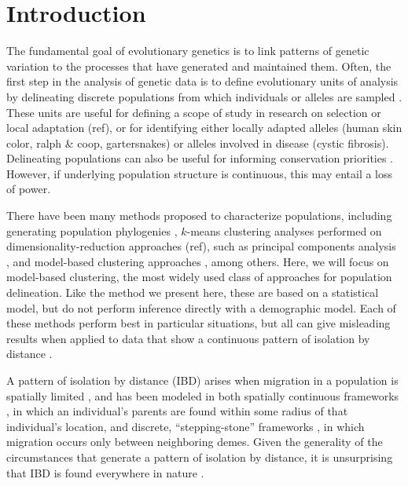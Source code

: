 \documentclass[12pt]{article}
\begin{document}
\newpage
\section*{Introduction}
The fundamental goal of evolutionary genetics is to link patterns of genetic variation 
to the processes that have generated and maintained them.
Often, the first step in the analysis of genetic data is to define evolutionary units of analysis
by delineating discrete populations from which individuals or alleles are sampled \citep{wright1949genetical}.
These units are useful for defining a scope of study in research on selection or local adaptation (ref),
or for identifying either locally adapted alleles (human skin color, ralph \& coop, gartersnakes) or alleles involved in disease (cystic fibrosis).
Delineating populations can also be useful for informing conservation priorities \citep{Moritz1994,Waples_1998,Moritz_etal_2002}.
However, if underlying population structure is continuous, this may entail a loss of power.

There have been many methods proposed to characterize populations,
including generating population phylogenies \citep{CavalliSforza1975, treemix},
$k$-means clustering analyses performed on dimensionality-reduction approaches (ref), 
such as principal components analysis \citep{menozzi1978synthetic,novembre_interpreting_2008, price2006eigenstrat},
and model-based clustering approaches \citep[e.g.][]{STRUCTURE, falush2003, hubisz2009,ADMIXTURE, FINESTRUCTURE, huelsenbeck2007inference, Corander2003,TESS,geneland}, among others.
Here, we will focus on model-based clustering, the most widely used class of approaches for population delineation.
Like the method we present here, these are based on a statistical model,
but do not perform inference directly with a demographic model.
Each of these methods perform best in particular situations,
but all can give misleading results when applied to data that show a continuous pattern of isolation by distance 
\citep{Wright1943, novembre_interpreting_2008, Frantz2009}.

A pattern of isolation by distance (IBD) arises when migration in a population is spatially limited \citep{Wright1943},
and has been modeled in both spatially continuous frameworks \citep{malecot1969mathematics,Slatkin1985}, 
in which an individual's parents are found within some radius of that individual's location,
and discrete, ``stepping-stone'' frameworks \citep{kimura1964stepping},
in which migration occurs only between neighboring demes.
Given the generality of the circumstances that generate a pattern of isolation by distance, 
it is unsurprising that IBD is found everywhere in nature \citep{meirmans2012,Sexton_etal_2014}.
\end{document}
